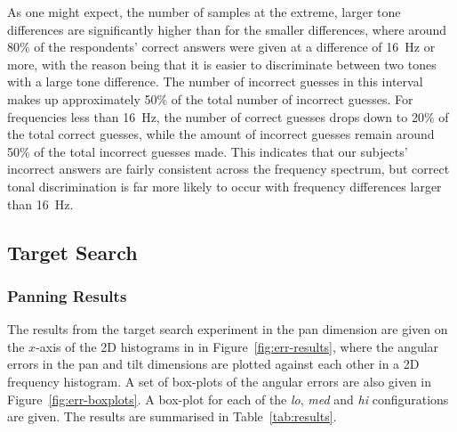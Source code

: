 \documentclass[format=sigconf, review=true, screen=true, anonymous=true]{acmart}
\begin{document}
As one might expect, the number of samples at the extreme, larger tone differences are significantly higher than for the smaller differences, where around 80\% of the respondents' correct answers were given at a difference of \SI{16}{\hertz} or more, with the reason being that it is easier to discriminate between two tones with a large tone difference. The number of incorrect guesses in this interval makes up approximately 50\% of the total number of incorrect guesses. For frequencies less than \SI{16}{\hertz}, the number of correct guesses drops down to 20\% of the total correct guesses, while the amount of incorrect guesses remain around 50\% of the total incorrect guesses made. This indicates that our subjects' incorrect answers are fairly consistent across the frequency spectrum, but correct tonal discrimination is far more likely to occur with frequency differences larger than \SI{16}{\hertz}.  


\subsection{Target Search}

\subsubsection{Panning Results}

The results from the target search experiment in the pan dimension are given on the $x$-axis of the 2D histograms in in Figure~\ref{fig:err-results}, where the angular errors in the pan and tilt dimensions are plotted against each other in a 2D frequency histogram. A set of box-plots of the angular errors are also given in Figure~\ref{fig:err-boxplots}. A box-plot for each of the \emph{lo}, \emph{med} and \emph{hi} configurations are given. The results are summarised in Table~\ref{tab:results}.
\end{document}
